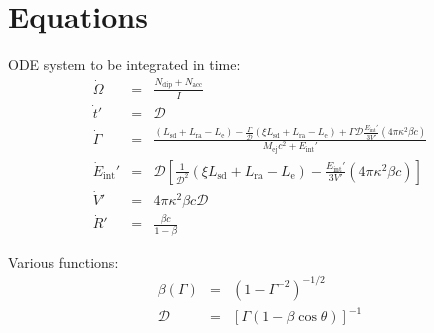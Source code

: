 \documentclass[11pt]{article} %
\newcommand{\tx}[1]{\textrm{#1}}
\begin{document}
\section{Equations}

ODE system to be integrated in time:
\begin{eqnarray}
\dot{\Omega}    &=& \frac{N_\tx{dip}+N_\tx{acc}}{I} \\
\dot{t}'               &=& \mathcal{D} \\
\dot{\Gamma}   &=& \frac{(L_\tx{sd}+L_\tx{ra}-L_\tx{e})-
                                             \tfrac{\Gamma}{\mathcal{D}}(\xi L_\tx{sd}+L_\tx{ra}-L_\tx{e})+
                                             \Gamma\mathcal{D}\tfrac{E_\tx{int}'}{3V'}(4\pi\kappa^2\beta c)}
                                           {M_\tx{ej}c^2+E_\tx{int}'} \\
\dot{E}_\tx{int}' &=& \mathcal{D}\left[\tfrac{1}{\mathcal{D}^2}(\xi L_\tx{sd}+L_\tx{ra}-L_\tx{e})-
                                                               \tfrac{E_\tx{int}'}{3V'}(4\pi\kappa^2\beta c)\right] \\
\dot{V}'             &=& 4\pi\kappa^2\beta c \mathcal{D} \\
\dot{R}'             &=& \frac{\beta c}{1-\beta}
\end{eqnarray}

Various functions:
\begin{eqnarray}
\beta(\Gamma) &=& (1-\Gamma^{-2})^{-1/2} \\
\mathcal{D}       &=& [\Gamma(1-\beta\cos\theta)]^{-1}
\end{eqnarray}



\end{document}
